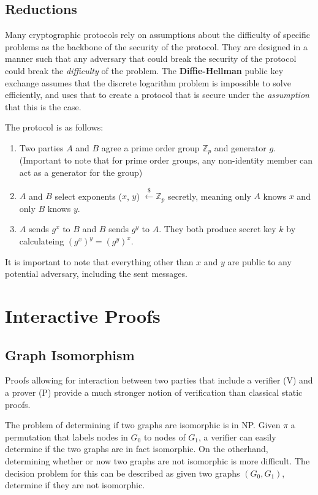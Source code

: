 \documentclass[11pt]{article}
\begin{document}
\subsection{Reductions}
Many cryptographic protocols rely on assumptions about the difficulty of specific problems as the backbone of the security of the protocol. They are designed in a manner such that any adversary that could break the security of the protocol could break the \textit{difficulty} of the problem. The \textbf{Diffie-Hellman} public key exchange assumes that the discrete logarithm problem is impossible to solve efficiently, and uses that to create a protocol that is secure under the \textit{assumption} that this is the case.
\vspace{1em}

The protocol is as follows:
\begin{enumerate}
\item Two parties $A$ and $B$ agree a prime order group $\mathbb{Z}_p$ and generator $g$. (Important to note that for prime order groups, any non-identity member can act as a generator for the group)
\item $A$ and $B$ select exponents ($x$, $y$) $\overset{\$}{\leftarrow} \mathbb{Z}_p$ secretly, meaning only $A$ knows $x$ and only $B$ knows $y$.
\item $A$ sends $g^x$ to $B$ and $B$ sends $g^y$ to $A$. They both produce secret key $k$ by calculateing $(g^x)^y = (g^y)^x$.
\end{enumerate}
It is important to note that everything other than $x$ and $y$ are public to any potential adversary, including the sent messages.

\section{Interactive Proofs}
\subsection{Graph Isomorphism}
Proofs allowing for interaction between two parties that include a verifier (V) and a prover (P) provide a much stronger notion of verification than classical static proofs.
\vspace{1em}

The problem of determining if two graphs are isomorphic is in NP. Given $\pi$ a permutation that labels nodes in $G_0$ to nodes of $G_1$, a verifier can easily determine if the two graphs are in fact isomorphic. On the otherhand, determining whether or now two graphs are not isomorphic is more difficult. The decision problem for this can be described as given two graphs $(G_0,G_1)$, determine if they are not isomorphic.
\vspace{1em}
\end{document}
